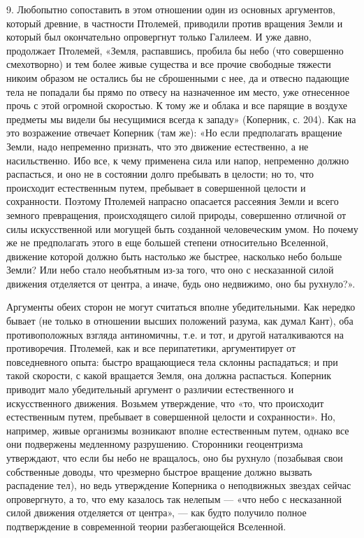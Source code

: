 9. Любопытно сопоставить в этом отношении один из основных аргументов,
который древние, в частности Птолемей, приводили против вращения Земли
и который был окончательно опровергнут только Галилеем. И уже давно,
продолжает Птолемей, «Земля, распавшись, пробила бы небо (что
совершенно смехотворно) и тем более живые существа и все прочие
свободные тяжести никоим образом не остались бы не сброшенными с нее,
да и отвесно падающие тела не попадали бы прямо по отвесу на
назначенное им место, уже отнесенное прочь с этой огромной скоростью.
К тому же и облака и все парящие в воздухе предметы мы видели бы
несущимися всегда к западу» (Коперник, с. 204). Как на это возражение
отвечает Коперник (там же): «Но если предполагать вращение Земли, надо
непременно признать, что это движение естественно, а не насильственно.
Ибо все, к чему применена сила или напор, непременно должно
распасться, и оно не в состоянии долго пребывать в целости; но то, что
происходит естественным путем, пребывает в совершенной целости и
сохранности. Поэтому Птолемей напрасно опасается рассеяния Земли и
всего земного превращения, происходящего силой природы, совершенно
отличной от силы искусственной или могущей быть созданной человеческим
умом. Но почему же не предполагать этого в еще большей степени
относительно Вселенной, движение которой должно быть настолько же
быстрее, насколько небо больше Земли? Или небо стало необъятным из-за
того, что оно с несказанной силой движения отделяется от центра, а
иначе, будь оно недвижимо, оно бы рухнуло?».

Аргументы обеих сторон не могут считаться вполне убедительными. Как
нередко бывает (не только в отношении высших положений разума, как
думал Кант), оба противоположных взгляда антиномичны, т.е. и тот, и
другой наталкиваются на противоречия. Птолемей, как и все
перипатетики, аргументирует от повседневного опыта: быстро вращающиеся
тела склонны распадаться; и при такой скорости, с какой вращается
Земля, она должна распасться. Коперник приводит мало убедительный
аргумент о различии естественного и искусственного движения. Возьмем
утверждение, что «то, что происходит естественным путем, пребывает в
совершенной целости и сохранности». Но, например, живые организмы
возникают вполне естественным путем, однако все они подвержены
медленному разрушению. Сторонники геоцентризма утверждают, что если бы
небо не вращалось, оно бы рухнуло (позабывая свои собственные доводы,
что чрезмерно быстрое вращение должно вызвать распадение тел), но ведь
утверждение Коперника о неподвижных звездах сейчас опровергнуто, а то,
что ему казалось так нелепым --- «что небо с несказанной силой
движения отделяется от центра», --- как будто получило полное
подтверждение в современной теории разбегающейся Вселенной.

